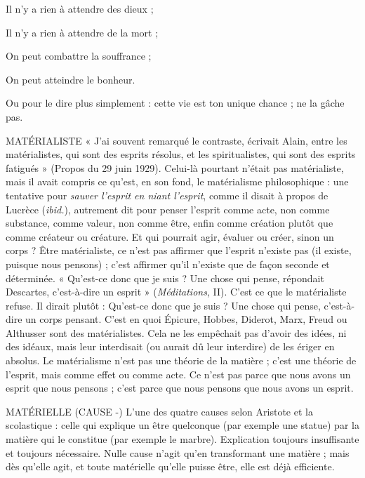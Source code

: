 Il n’y a rien à attendre des dieux ;

Il n’y a rien à attendre de la mort ;

On peut combattre la souffrance ;

On peut atteindre le bonheur.

Ou pour le dire plus simplement : cette vie est ton unique chance ; ne la
gâche pas.

MATÉRIALISTE « J'ai souvent remarqué le contraste, écrivait Alain, entre
les matérialistes, qui sont des esprits résolus, et les spiritualistes,
qui sont des esprits fatigués » (Propos du 29 juin 1929). Celui-là pourtant
n'était pas matérialiste, mais il avait compris ce qu'est, en son fond, le
matérialisme philosophique : une tentative pour {\it sauver l'esprit en niant
l'esprit}, comme il disait à propos de Lucrèce ({\it ibid.}), autrement dit pour
penser l’esprit comme acte, non comme substance, comme valeur, non
comme être, enfin comme création plutôt que comme créateur ou créature.
Et qui pourrait agir, évaluer ou créer, sinon un corps ? Être matérialiste, ce
n’est pas affirmer que l'esprit n’existe pas (il existe, puisque nous pensons) ;
c’est affirmer qu’il n’existe que de façon seconde et déterminée. « Qu'est-ce
donc que je suis ? Une chose qui pense, répondait Descartes, c’est-à-dire un
esprit » ({\it Méditations}, II). C’est ce que le matérialiste refuse. Il dirait plutôt :
Qu'est-ce donc que je suis ? Une chose qui pense, c’est-à-dire un corps pensant.
C’est en quoi Épicure, Hobbes, Diderot, Marx, Freud ou Althusser sont
des matérialistes. Cela ne les empêchait pas d’avoir des idées, ni des idéaux,
mais leur interdisait (ou aurait dû leur interdire) de les ériger en absolus. Le
matérialisme n’est pas une théorie de la matière ; c’est une théorie de l'esprit,
mais comme effet ou comme acte. Ce n’est pas parce que nous avons un
esprit que nous pensons ; c’est parce que nous pensons que nous avons un
esprit.

MATÉRIELLE (CAUSE -) L'une des quatre causes selon Aristote et la scolastique :
celle qui explique un être quelconque
(par exemple une statue) par la matière qui le constitue (par exemple le
marbre). Explication toujours insuffisante et toujours nécessaire. Nulle cause
n’agit qu’en transformant une matière ; mais dès qu’elle agit, et toute matérielle
qu’elle puisse être, elle est déjà efficiente.

